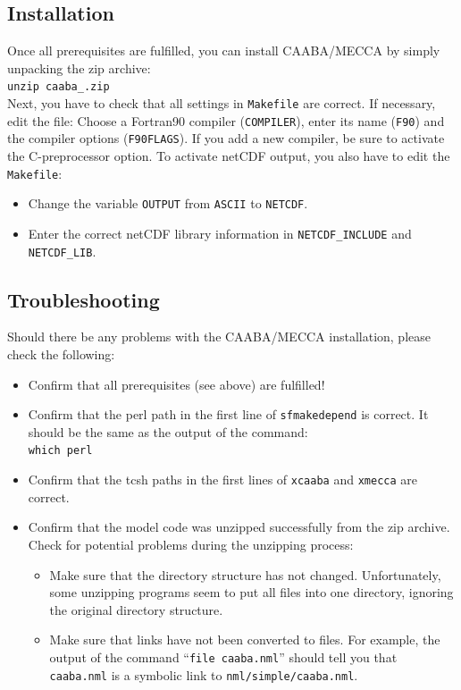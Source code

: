 \documentclass[twoside]{article}
\def\nosep{\setlength\parsep{0mm}\setlength\topsep{0mm}\setlength\itemsep{0mm}}
\begin{document}
\subsection{Installation}

Once all prerequisites are fulfilled, you can install CAABA/MECCA by
simply unpacking the zip archive:\\[2mm]
{\tt unzip caaba\_\meccaversion.zip}\\[2mm]

Next, you have to check that all settings in \verb|Makefile| are
correct. If necessary, edit the file: Choose a Fortran90 compiler
(\verb|COMPILER|), enter its name (\verb|F90|) and the compiler options
(\verb|F90FLAGS|). If you add a new compiler, be sure to activate the
C-preprocessor option. To activate netCDF output, you also have to edit
the \verb|Makefile|:
\begin{itemize}\nosep
\item Change the variable \verb|OUTPUT| from \verb|ASCII| to
  \verb|NETCDF|.
\item Enter the correct netCDF library information in
  \verb|NETCDF_INCLUDE| and \verb|NETCDF_LIB|.
\end{itemize}

\subsection{Troubleshooting}

Should there be any problems with the CAABA/MECCA installation, please
check the following:
\begin{itemize}\nosep
\item Confirm that all prerequisites (see above) are fulfilled!
\item Confirm that the perl path in the first line of
  \verb|sfmakedepend| is correct. It should be the same as the output of
  the command:\\
  \verb|which perl|
\item Confirm that the tcsh paths in the first lines of
  \verb|xcaaba| and \verb|xmecca| are correct.
\item Confirm that the model code was unzipped successfully from the zip
  archive. Check for potential problems during the unzipping process:
  \begin{itemize}
  \item Make sure that the directory structure has not changed.
    Unfortunately, some unzipping programs seem to put all files into
    one directory, ignoring the original directory structure.
  \item Make sure that links have not been converted to files. For
    example, the output of the command ``\verb|file caaba.nml|'' should
    tell you that \verb|caaba.nml| is a symbolic link to
    \verb|nml/simple/caaba.nml|.
  \end{itemize}
\end{itemize}
\end{document}
